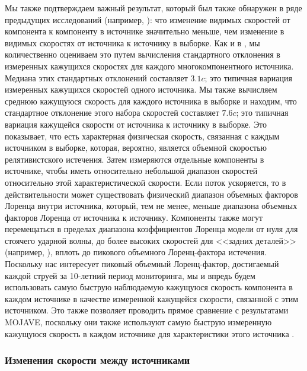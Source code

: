 Мы также подтверждаем важный результат, который был также обнаружен в ряде предыдущих исследований
(например, \cite{Lister_2009b,Kellermann_2004,Piner_2007}): что изменение видимых скоростей от
компонента к компоненту в источнике значительно меньше, чем изменение в видимых скоростях от
источника к источнику в выборке. Как и в \cite{Lister_2009b}, мы количественно оцениваем это путем
вычисления стандартного отклонения в измеренных кажущихся скоростях для каждого многокомпонентного
источника. Медиана этих стандартных отклонений составляет $3.1c$; это типичная вариация измеренных
кажущихся скоростей одного источника. Мы также вычисляем среднюю кажущуюся скорость для каждого
источника в выборке и находим, что стандартное отклонение этого набора скоростей составляет $7.6c$;
это типичная вариация кажущейся скорости от источника к источнику в выборке. Это показывает, что
есть характерная физическая скорость, связанная с каждым источником в выборке, которая, вероятно,
является объемной скоростью релятивистского истечения. Затем измеряются отдельные компоненты в
источнике, чтобы иметь относительно небольшой диапазон скоростей относительно этой
характеристической скорости. Если поток ускоряется, то в действительности может существовать
физический диапазон объемных факторов Лоренца внутри источника, который, тем не менее, меньше
диапазона объемных факторов Лоренца от источника к источнику. Компоненты также могут перемещаться в
пределах диапазона коэффициентов Лоренца модели от нуля для стоячего ударной волны, до более высоких
скоростей для <<задних деталей>> (например, \cite{Kadler_2008,Perucho_2008}), вплоть до пикового
объемного Лоренц-фактора истечения. Поскольку нас интересует пиковый объемный Лоренц-фактор,
достигаемый каждой струей за 10-летний период мониторинга, мы и впредь будем использовать самую
быструю наблюдаемую кажущуюся скорость компонента в каждом источнике в качестве измеренной кажущейся
скорости, связанной с этим источником. Это также позволяет проводить прямое сравнение с результатами
MOJAVE, поскольку они также используют самую быструю измеренную кажущуюся скорость в каждом
источнике для характеристики этого источника \cite{Lister_2009b}.

\subsubsection{Изменения скорости между источниками}

